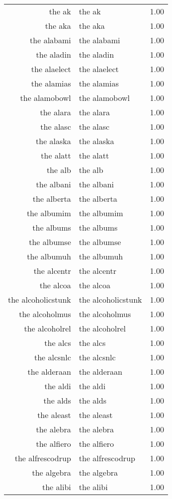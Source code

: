 \begin{table}[ht]
\begin{tabular}{rlr}
  the ak & the ak & 1.00 \\ 
  the aka & the aka & 1.00 \\ 
  the alabami & the alabami & 1.00 \\ 
  the aladin & the aladin & 1.00 \\ 
  the alaelect & the alaelect & 1.00 \\ 
  the alamias & the alamias & 1.00 \\ 
  the alamobowl & the alamobowl & 1.00 \\ 
  the alara & the alara & 1.00 \\ 
  the alasc & the alasc & 1.00 \\ 
  the alaska & the alaska & 1.00 \\ 
  the alatt & the alatt & 1.00 \\ 
  the alb & the alb & 1.00 \\ 
  the albani & the albani & 1.00 \\ 
  the alberta & the alberta & 1.00 \\ 
  the albumim & the albumim & 1.00 \\ 
  the albums & the albums & 1.00 \\ 
  the albumse & the albumse & 1.00 \\ 
  the albumuh & the albumuh & 1.00 \\ 
  the alcentr & the alcentr & 1.00 \\ 
  the alcoa & the alcoa & 1.00 \\ 
  the alcoholicstunk & the alcoholicstunk & 1.00 \\ 
  the alcoholmus & the alcoholmus & 1.00 \\ 
  the alcoholrel & the alcoholrel & 1.00 \\ 
  the alcs & the alcs & 1.00 \\ 
  the alcsnlc & the alcsnlc & 1.00 \\ 
  the alderaan & the alderaan & 1.00 \\ 
  the aldi & the aldi & 1.00 \\ 
  the alds & the alds & 1.00 \\ 
  the aleast & the aleast & 1.00 \\ 
  the alebra & the alebra & 1.00 \\ 
  the alfiero & the alfiero & 1.00 \\ 
  the alfrescodrup & the alfrescodrup & 1.00 \\ 
  the algebra & the algebra & 1.00 \\ 
  the alibi & the alibi & 1.00 \\ 

\end{tabular}
\end{table}
